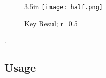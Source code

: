 \documentclass[]{report}   %
\begin{document}
\begin{wrapfigure}{3.5in}
 \centering
 \texttt{[image: half.png]}
 \caption{Key Resul; r=0.5}
\end{wrapfigure}


	
	. 
	
\subsection{Usage}         %



\begin{thebibliography}{9}
\end{thebibliography}
\end{document}
